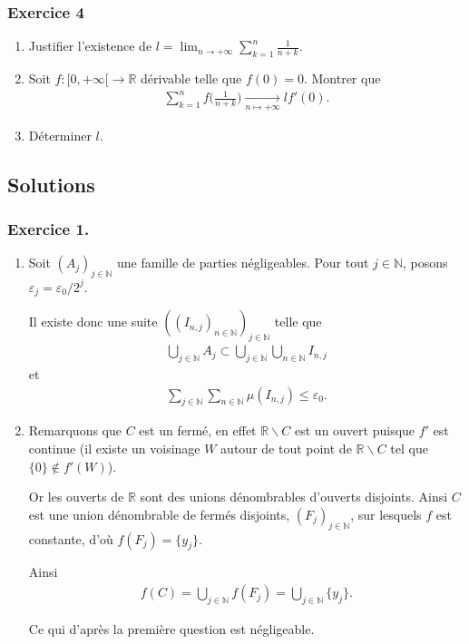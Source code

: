 \documentclass{article}
\begin{document}
\subsubsection*{Exercice 4}
\begin{enumerate}
\item Justifier l'existence de $\displaystyle l=\lim_{n\to+\infty} \sum_{k=1}^{n} \frac{1}{n+k}$.
\item Soit $f : [0,+\infty[ \to \mathbb{R}$ dérivable telle que $f(0)=0$. Montrer que 
\begin{align*}
\sum_{k=1}^{n}{f\bigg(\frac{1}{n+k}\bigg)} \xrightarrow[n\mapsto+\infty]{} lf'(0).
\end{align*}
\item Déterminer $l$.
\end{enumerate}
\subsection*{Solutions} 
\subsubsection*{Exercice 1.}
\begin{enumerate}
\item Soit $(A_j)_{j\in\mathbb{N}}$ une famille de parties négligeables. Pour tout $j\in\mathbb{N}$, posons $\varepsilon_j = \varepsilon_0/2^j$.

Il existe donc une suite $((I_{n,j})_{n\in\mathbb{N}})_{j\in\mathbb{N}}$ telle que \begin{align*}
\bigcup_{j\in\mathbb{N}}{A_j}\subset \bigcup_{j\in\mathbb{N}}\bigcup_{n\in\mathbb{N}}I_{n,j}
\end{align*}
et 
\begin{align*}
\sum_{j\in\mathbb{N}}{\sum_{n\in\mathbb{N}}}{\mu(I_{n,j})}\leq \varepsilon_0.
\end{align*}
\item Remarquons que $C$ est un fermé, en effet $\mathbb{R}\backslash C$ est un ouvert puisque $f'$ est continue (il existe un voisinage $W$ autour de tout point de $\mathbb{R}\backslash C$ tel que $\{0\}\notin f'(W)$).

Or les ouverts de $\mathbb{R}$ sont des unions dénombrables d'ouverts disjoints. Ainsi $C$ est une union dénombrable de fermés disjoints, $(F_j)_{j\in\mathbb{N}}$, sur lesquels $f$ est constante, d'où $f(F_j)=\{y_j\}$.

Ainsi 
\begin{align*}
f(C) = \bigcup_{j\in\mathbb{N}}{f(F_j)}=\bigcup_{j\in\mathbb{N}}\{y_j\}.
\end{align*}

Ce qui d'après la première question est négligeable.
\end{enumerate}
\newpage{}
\end{document}
